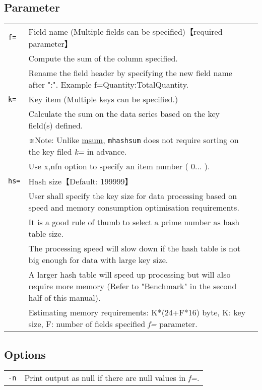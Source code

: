 \documentclass[a4paper]{jarticle}
\begin{document}
\subsection*{Parameter}
\begin{table}[htbp]
{\small
\begin{tabular}{l p{15cm} l}
\verb|f=|    & Field name (Multiple fields can be specified)【required parameter】\\
& Compute the sum of the column specified.  \\
& Rename the field header by specifying the new field name after ":". Example f=Quantity:TotalQuantity. \\
\verb|k=|    & Key item (Multiple keys can be specified.)\\
& Calculate the sum on the data series based on the key field(s) defined. \\
& ※Note: Unlike \href{run:msum.pdf}{msum}, \verb|mhashsum| does not require sorting on the key filed \emph{k=} in advance.\\
& Use x,nfn option to specify an item number ( 0... ). \\
\verb|hs=|    & Hash size【Default: 199999】 \\
& User shall specify the key size for data processing based on speed and memory consumption optimisation requirements.  \\
& It is a good rule of thumb to select a prime number as hash table size.\\
& The processing speed will slow down if the hash table is not big enough for data with large key size.  \\
& A larger hash table will speed up processing but will also require more memory (Refer to "Benchmark" in the second half of this manual). \\
&  Estimating memory requirements: K*(24+F*16) byte, K: key size, F: number of fields specified \emph{f=} parameter. \\
\end{tabular} 
}
\end{table} 

\subsection*{Options}
\begin{table}[htbp]
{\small
\begin{tabular}{ll}
\verb|-n|    & Print output as null if there are null values in \emph{f=}. \\
\end{tabular} 
}
\end{table} 
\end{document}
